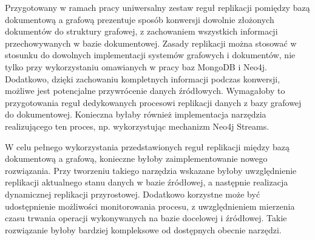 \documentclass[a4paper,twoside,12pt]{book}
\newcounter{stronyPozaNumeracja}
\begin{document}
Przygotowany w ramach pracy uniwersalny zestaw reguł replikacji pomiędzy bazą dokumentową a grafową prezentuje sposób konwersji dowolnie złożonych dokumentów do struktury grafowej, z zachowaniem wszystkich informacji przechowywanych w bazie dokumentowej. Zasady replikacji można stosować w stosunku do dowolnych implementacji systemów grafowych i dokumentów, nie tylko przy wykorzystaniu omawianych w pracy baz MongoDB i Neo4j. Dodatkowo, dzięki zachowaniu kompletnych informacji podczas konwersji, możliwe jest potencjalne przywrócenie danych źródłowych. Wymagałoby to przygotowania reguł dedykowanych procesowi replikacji danych z bazy grafowej do dokumentowej. Konieczna byłaby również implementacja narzędzia realizującego ten proces, np. wykorzystując mechanizm Neo4j Streams.

W celu pełnego wykorzystania przedstawionych reguł replikacji między bazą dokumentową a grafową, konieczne byłoby zaimplementowanie nowego rozwiązania. Przy tworzeniu takiego narzędzia wskazane byłoby uwzględnienie replikacji aktualnego stanu danych w bazie źródłowej, a następnie realizacja dynamicznej replikacji przyrostowej. Dodatkowo korzystne może być udostępnienie możliwości monitorowania procesu, z uwzględnieniem mierzenia czasu trwania operacji wykonywanych na bazie docelowej i źródłowej. Takie rozwiązanie byłoby bardziej kompleksowe od dostępnych obecnie narzędzi. 


\backmatter
{}
\setcounter{page}{\value{stronyPozaNumeracja}}

\pagestyle{tylkoNumeryStron}



\end{document}
